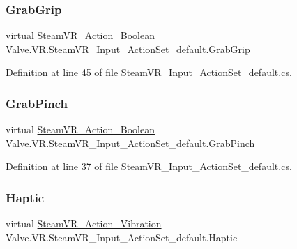 \subsubsection{\texorpdfstring{GrabGrip}{GrabGrip}}
{\footnotesize\ttfamily virtual \mbox{\hyperlink{class_valve_1_1_v_r_1_1_steam_v_r___action___boolean}{Steam\+V\+R\+\_\+\+Action\+\_\+\+Boolean}} Valve.\+V\+R.\+Steam\+V\+R\+\_\+\+Input\+\_\+\+Action\+Set\+\_\+default.\+Grab\+Grip\hspace{0.3cm}{\ttfamily [get]}}



Definition at line 45 of file Steam\+V\+R\+\_\+\+Input\+\_\+\+Action\+Set\+\_\+default.\+cs.

\mbox{\label{class_valve_1_1_v_r_1_1_steam_v_r___input___action_set__default_a4ec4a07ae606f78eb507a24a32f439d1}} 
\subsubsection{\texorpdfstring{GrabPinch}{GrabPinch}}
{\footnotesize\ttfamily virtual \mbox{\hyperlink{class_valve_1_1_v_r_1_1_steam_v_r___action___boolean}{Steam\+V\+R\+\_\+\+Action\+\_\+\+Boolean}} Valve.\+V\+R.\+Steam\+V\+R\+\_\+\+Input\+\_\+\+Action\+Set\+\_\+default.\+Grab\+Pinch\hspace{0.3cm}{\ttfamily [get]}}



Definition at line 37 of file Steam\+V\+R\+\_\+\+Input\+\_\+\+Action\+Set\+\_\+default.\+cs.

\mbox{\label{class_valve_1_1_v_r_1_1_steam_v_r___input___action_set__default_a91f2c4c27462284108c1b852c74bb3aa}} 
\subsubsection{\texorpdfstring{Haptic}{Haptic}}
{\footnotesize\ttfamily virtual \mbox{\hyperlink{class_valve_1_1_v_r_1_1_steam_v_r___action___vibration}{Steam\+V\+R\+\_\+\+Action\+\_\+\+Vibration}} Valve.\+V\+R.\+Steam\+V\+R\+\_\+\+Input\+\_\+\+Action\+Set\+\_\+default.\+Haptic\hspace{0.3cm}{\ttfamily [get]}}



